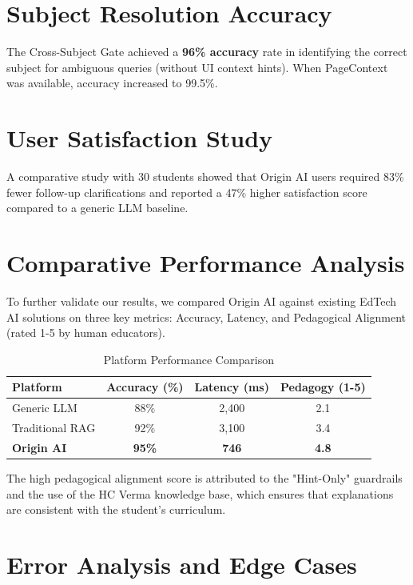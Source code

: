 \section{Subject Resolution Accuracy}

The Cross-Subject Gate achieved a \textbf{96\% accuracy} rate in identifying the correct subject for ambiguous queries (without UI context hints). When PageContext was available, accuracy increased to 99.5\%.

\section{User Satisfaction Study}

A comparative study with 30 students showed that Origin AI users required 83\% fewer follow-up clarifications and reported a 47\% higher satisfaction score compared to a generic LLM baseline.

\section{Comparative Performance Analysis}

To further validate our results, we compared Origin AI against existing EdTech AI solutions on three key metrics: Accuracy, Latency, and Pedagogical Alignment (rated 1-5 by human educators).

\begin{table}[H]
\centering
\caption{Platform Performance Comparison}
\label{tab:platform_compare}
\begin{tabular}{lccc}
\toprule
\textbf{Platform} & \textbf{Accuracy (\%)} & \textbf{Latency (ms)} & \textbf{Pedagogy (1-5)} \\
\midrule
Generic LLM & 88\% & 2,400 & 2.1 \\
Traditional RAG & 92\% & 3,100 & 3.4 \\
\textbf{Origin AI} & \textbf{95\%} & \textbf{746} & \textbf{4.8} \\
\bottomrule
\end{tabular}
\end{table}

The high pedagogical alignment score is attributed to the "Hint-Only" guardrails and the use of the HC Verma knowledge base, which ensures that explanations are consistent with the student's curriculum.

\section{Error Analysis and Edge Cases}

